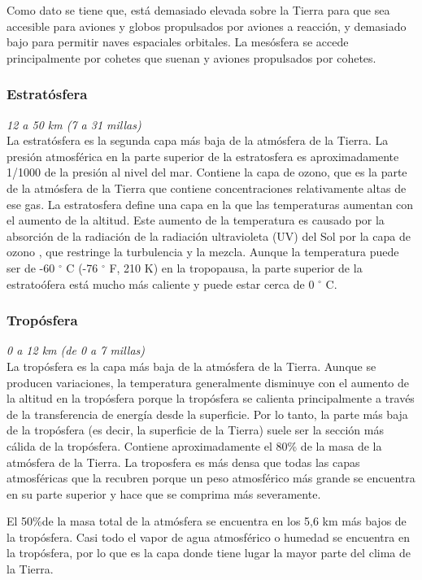 \documentclass[12pt]{article}
\begin{document}
Como dato se tiene que, está demasiado elevada sobre la Tierra para que sea accesible para aviones y globos propulsados por aviones a reacción, y demasiado bajo para permitir naves espaciales orbitales. La mesósfera se accede principalmente por cohetes que suenan y aviones propulsados por cohetes.

\subsubsection{Estratósfera}
\textit{12 a 50 km (7 a 31 millas)}\\
La estratósfera es la segunda capa más baja de la atmósfera de la Tierra. La presión atmosférica en la parte superior de la estratosfera es aproximadamente 1/1000 de la presión al nivel del mar. Contiene la capa de ozono, que es la parte de la atmósfera de la Tierra que contiene concentraciones relativamente altas de ese gas. La estratosfera define una capa en la que las temperaturas aumentan con el aumento de la altitud. Este aumento de la temperatura es causado por la absorción de la radiación de la radiación ultravioleta (UV) del Sol por la capa de ozono , que restringe la turbulencia y la mezcla. Aunque la temperatura puede ser de -60 $^{\circ}$ C (-76 $^{\circ}$ F, 210 K) en la tropopausa, la parte superior de la estratoófera está mucho más caliente y puede estar cerca de 0 $^{\circ}$ C.

\subsubsection{Tropósfera}
\textit{0 a 12 km (de 0 a 7 millas)}\\
La tropósfera es la capa más baja de la atmósfera de la Tierra. Aunque se producen variaciones, la temperatura generalmente disminuye con el aumento de la altitud en la tropósfera porque la tropósfera se calienta principalmente a través de la transferencia de energía desde la superficie. Por lo tanto, la parte más baja de la tropósfera (es decir, la superficie de la Tierra) suele ser la sección más cálida de la tropósfera. Contiene aproximadamente el 80\% de la masa de la atmósfera de la Tierra. La troposfera es más densa que todas las capas atmosféricas que la recubren porque un peso atmosférico más grande se encuentra en su parte superior y hace que se comprima más severamente.

El 50\%de la masa total de la atmósfera se encuentra en los 5,6 km más bajos de la tropósfera.
Casi todo el vapor de agua atmosférico o humedad se encuentra en la tropósfera, por lo que es la capa donde tiene lugar la mayor parte del clima de la Tierra.
\end{document}
